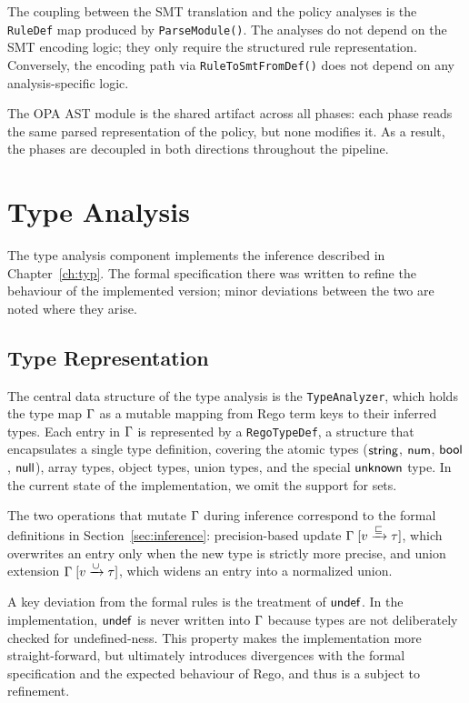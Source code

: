The coupling between the SMT translation and the policy analyses is the \texttt{RuleDef}
map produced by \texttt{ParseModule()}.
The analyses do not depend on the SMT encoding logic; they only require the structured
rule representation.
Conversely, the encoding path via \texttt{RuleToSmtFromDef()} does not depend on any
analysis-specific logic.

The OPA AST module is the shared artifact across all phases: each phase reads the same
parsed representation of the policy, but none modifies it.
As a result, the phases are decoupled in both directions throughout the pipeline.

\section{Type Analysis}
\label{s:ta}

The type analysis component implements the inference described in Chapter~\ref{ch:typ}.
The formal specification there was written to refine the behaviour of the implemented version; minor deviations between the two are noted where they arise.

\subsection{Type Representation}
\label{ss:ta:rep}

The central data structure of the type analysis is the \texttt{TypeAnalyzer}, which
holds the type map $\Gamma$ as a mutable mapping from Rego term keys to their inferred
types.
Each entry in $\Gamma$ is represented by a \texttt{RegoTypeDef}, a structure that
encapsulates a single type definition, covering the atomic types ($\mathsf{string}$, $\mathsf{num}$,
$\mathsf{bool}$, $\mathsf{null}$), array types, object types, union types, and the special $\mathsf{unknown}$
type.
In the current state of the implementation, we omit the support for sets.

The two operations that mutate $\Gamma$ during inference correspond to the formal
definitions in Section~\ref{sec:inference}: precision-based update $\Gamma \mathrel{[v \xrightarrow{\sqsubseteq} \tau]}$,
which overwrites an entry only when the new type is strictly more precise, and union
extension $\Gamma \mathrel{[v \xrightarrow{\cup} \tau]}$, which widens an entry into a normalized union.

A key deviation from the formal rules is the treatment of $\mathsf{undef}$.
In the implementation, $\mathsf{undef}$ is never written into $\Gamma$ because types are not deliberately checked for undefined-ness.
This property makes the implementation more straight-forward, but ultimately introduces divergences with the formal specification and the expected behaviour of Rego, and thus is a subject to refinement.

